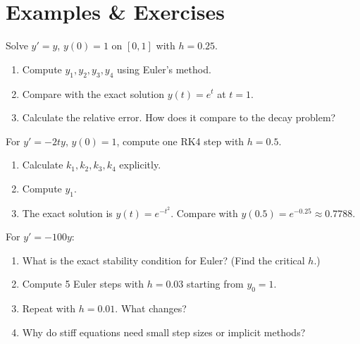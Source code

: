 
\newpage
\section{Examples \& Exercises}


 Solve $y' = y$, $y(0) = 1$ on $[0, 1]$ with $h = 0.25$.

\begin{enumerate}[label=(\alph*)]
    \item Compute $y_1, y_2, y_3, y_4$ using Euler's method.
    \item Compare with the exact solution $y(t) = e^t$ at $t = 1$.
    \item Calculate the relative error. How does it compare to the decay problem?
\end{enumerate}


\vspace{2em}
 For $y' = -2ty$, $y(0) = 1$, compute one RK4 step with $h = 0.5$.

\begin{enumerate}[label=(\alph*)]
    \item Calculate $k_1, k_2, k_3, k_4$ explicitly.
    \item Compute $y_1$.
    \item The exact solution is $y(t) = e^{-t^2}$. Compare with $y(0.5) = e^{-0.25} \approx 0.7788$.
\end{enumerate}



\vspace{2em}
 For $y' = -100y$:
\begin{enumerate}[label=(\alph*)]
    \item What is the exact stability condition for Euler? (Find the critical $h$.)
    \item Compute 5 Euler steps with $h = 0.03$ starting from $y_0 = 1$.
    \item Repeat with $h = 0.01$. What changes?
    \item Why do stiff equations need small step sizes or implicit methods?
\end{enumerate}


